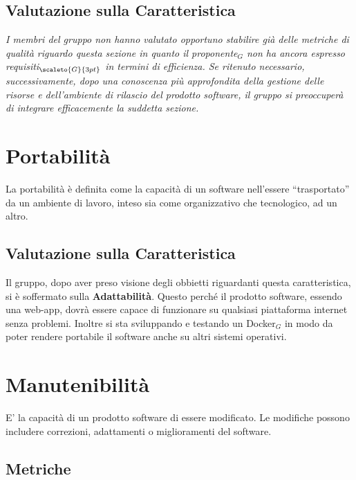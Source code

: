 \subsection{Valutazione sulla Caratteristica} \label{QualitàDelProdottoEfficienzaValutazioneSullaCaratteristica}
\textit{I membri del gruppo non hanno valutato opportuno stabilire già delle metriche di qualità riguardo questa sezione in quanto il proponente$_G$ non ha ancora espresso requisiti$_{\scaleto{G}{3pt}}$ in termini di efficienza. Se ritenuto necessario, successivamente, dopo una conoscenza più approfondita della gestione delle risorse e dell’ambiente di rilascio del prodotto software, il gruppo si preoccuperà di integrare efficacemente la suddetta sezione.}

\section{Portabilità} \label{QualitàDelProdottoPortabilità}
La portabilità è definita come la capacità di un software nell’essere “trasportato” da un ambiente di lavoro, inteso sia come organizzativo che tecnologico,  ad un altro.

\subsection{Valutazione sulla Caratteristica} \label{QualitàDelProdottoPortabilitàValutazioneSullaCaratteristica}
Il gruppo, dopo aver preso visione degli obbietti riguardanti questa caratteristica, si è soffermato sulla \textbf{Adattabilità}.
Questo perché il prodotto software, essendo una web-app, dovrà essere capace di funzionare su qualsiasi piattaforma internet senza problemi.
Inoltre si sta sviluppando e testando un Docker$_G$ in modo da poter rendere portabile il software anche su altri sistemi operativi.

\section{Manutenibilità} \label{QualitàDelProdottoManutenibilità}
E' la capacità di un prodotto software di essere modificato. Le modifiche possono includere correzioni, adattamenti o miglioramenti del software.
\subsection{Metriche}  \label{QualitàDelProdottoManutenibilitàMetriche}
